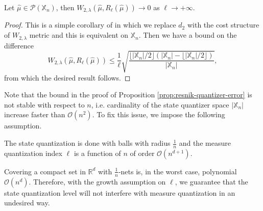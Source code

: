 \documentclass[11pt]{article}
\newcommand{\RR}{\mathbb{R}}
\newcommand{\XX}{\mathbb{X}}
\newcommand{\cO}{\mathcal{O}}
\newcommand{\cP}{\mathcal{P}}
\begin{document}
\begin{proposition}\label{prop:resnik-quantizer-error}
    Let $\hat{\mu}\in\cP(\XX_n)$, then $W_{2,\lambda}(\hat{\mu}, R_\ell(\hat{\mu}))\to 0$ as $\ell\to+\infty$.
\end{proposition}
\begin{proof}
    This is a simple corollary of \cite[Proposition 2]{reznik2011algorithm} in which we replace $d_2$ with the cost structure of $W_{2,\lambda}$ metric and this is equivalent on $\XX_n$. Then we have a bound on the difference
    \begin{equation*}
        W_{2,\lambda}(\hat{\mu}, R_\ell(\hat{\mu})) \leq \frac{1}{\ell} \sqrt{\frac{\lfloor|\XX_n|/2\rfloor(|\XX_n| - \lfloor|\XX_n|/2\rfloor)}{|\XX_n|}},
    \end{equation*}
    from which the desired result follows.
\end{proof}

Note that the bound in the proof of Proposition \ref{prop:resnik-quantizer-error} is not stable with respect to $n$, i.e. cardinality of the state quantizer space $|\XX_n|$ increase faster than $\cO(n^2)$. To fix this issue, we impose the following assumption.
\begin{assume}\label{assume:growth-assumptions}
    The state quantization is done with balls with radius $\frac{1}{n}$ and the measure quantization index $\ell$ is a function of $n$ of order $\cO(n^{d+1})$.
\end{assume}
Covering a compact set in $\RR^d$ with $\frac{1}{n}$-nets is, in the worst case, polynomial $\cO(n^d)$. Therefore, with the growth assumption on $\ell$, we guarantee that the state quantization level will not interfere with measure quantization in an undesired way.
\end{document}
